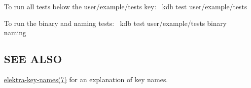 To run all tests below the {\ttfamily user/example/tests} key\+:~\newline
 {\ttfamily kdb test user/example/tests}~\newline


To run the {\ttfamily binary} and {\ttfamily naming} tests\+:~\newline
 {\ttfamily kdb test user/example/tests binary naming}~\newline


\subsection*{S\+EE A\+L\+SO}


\begin{DoxyItemize}
\item \hyperlink{doc_help_elektra-key-names_md}{elektra-\/key-\/names(7)} for an explanation of key names. 
\end{DoxyItemize}